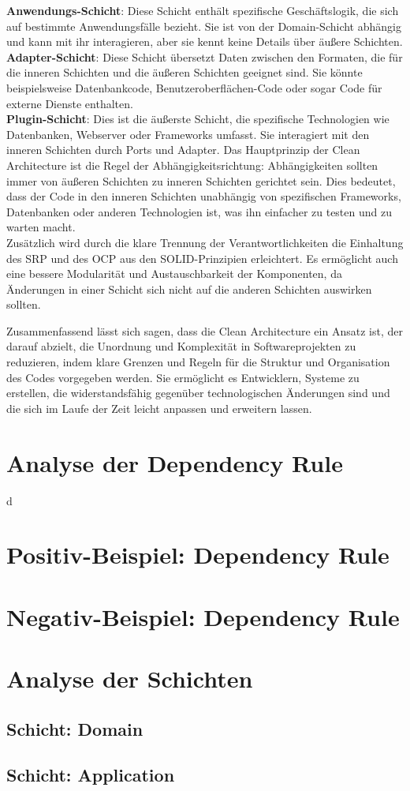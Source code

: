 \textbf{Anwendungs-Schicht}: Diese Schicht enthält spezifische Geschäftslogik, die sich auf bestimmte Anwendungsfälle bezieht. Sie ist von der Domain-Schicht abhängig und kann mit ihr interagieren, aber sie kennt keine Details über äußere Schichten.\\

\textbf{Adapter-Schicht}: Diese Schicht übersetzt Daten zwischen den Formaten, die für die inneren Schichten und die äußeren Schichten geeignet sind. Sie könnte beispielsweise Datenbankcode, Benutzeroberflächen-Code oder sogar Code für externe Dienste enthalten.\\

\textbf{Plugin-Schicht}: Dies ist die äußerste Schicht, die spezifische Technologien wie Datenbanken, Webserver oder Frameworks umfasst. Sie interagiert mit den inneren Schichten durch Ports und Adapter.
\newpage
Das Hauptprinzip der Clean Architecture ist die Regel der Abhängigkeitsrichtung: Abhängigkeiten sollten immer von äußeren Schichten zu inneren Schichten gerichtet sein. Dies bedeutet, dass der Code in den inneren Schichten unabhängig von spezifischen Frameworks, Datenbanken oder anderen Technologien ist, was ihn einfacher zu testen und zu warten macht.\\

Zusätzlich wird durch die klare Trennung der Verantwortlichkeiten die Einhaltung des \acf{SRP} und des \acf{OCP} aus den SOLID-Prinzipien erleichtert. Es ermöglicht auch eine bessere Modularität und Austauschbarkeit der Komponenten, da Änderungen in einer Schicht sich nicht auf die anderen Schichten auswirken sollten.

Zusammenfassend lässt sich sagen, dass die Clean Architecture ein Ansatz ist, der darauf abzielt, die Unordnung und Komplexität in Softwareprojekten zu reduzieren, indem klare Grenzen und Regeln für die Struktur und Organisation des Codes vorgegeben werden. Sie ermöglicht es Entwicklern, Systeme zu erstellen, die widerstandsfähig gegenüber technologischen Änderungen sind und die sich im Laufe der Zeit leicht anpassen und erweitern lassen.
\section{Analyse der Dependency Rule}
d
\section{Positiv-Beispiel: Dependency Rule}
\section{Negativ-Beispiel: Dependency Rule}
\section{Analyse der Schichten}
\subsection{Schicht: Domain}
\subsection{Schicht: Application}